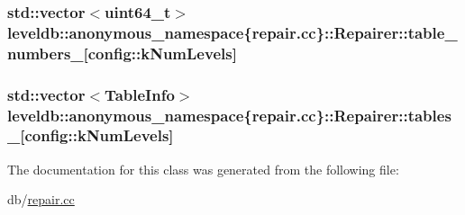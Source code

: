 \subsubsection[{table\+\_\+numbers\+\_\+}]{\setlength{\rightskip}{0pt plus 5cm}std\+::vector$<${\bf uint64\+\_\+t}$>$ leveldb\+::anonymous\+\_\+namespace\{repair.\+cc\}\+::Repairer\+::table\+\_\+numbers\+\_\+\mbox{[}{\bf config\+::k\+Num\+Levels}\mbox{]}\hspace{0.3cm}{\ttfamily [private]}}\label{classleveldb_1_1anonymous__namespace_02repair_8cc_03_1_1_repairer_a1804cc3ae7d3bf5e49c0bdabcc8a9934}
\hypertarget{classleveldb_1_1anonymous__namespace_02repair_8cc_03_1_1_repairer_abd7601c6bc61f6ce6a1d90959636fafb}{}
\subsubsection[{tables\+\_\+}]{\setlength{\rightskip}{0pt plus 5cm}std\+::vector$<${\bf Table\+Info}$>$ leveldb\+::anonymous\+\_\+namespace\{repair.\+cc\}\+::Repairer\+::tables\+\_\+\mbox{[}{\bf config\+::k\+Num\+Levels}\mbox{]}\hspace{0.3cm}{\ttfamily [private]}}\label{classleveldb_1_1anonymous__namespace_02repair_8cc_03_1_1_repairer_abd7601c6bc61f6ce6a1d90959636fafb}


The documentation for this class was generated from the following file\+:\begin{DoxyCompactItemize}
\item 
db/\hyperlink{repair_8cc}{repair.\+cc}\end{DoxyCompactItemize}
